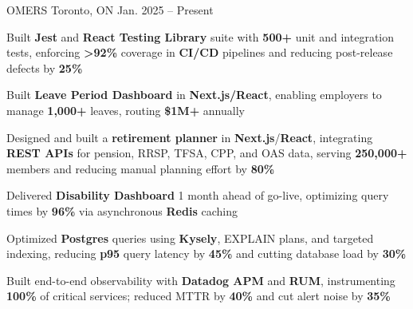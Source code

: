 \documentclass[11pt, a4paper]{awesome-cv}
\begin{document}
\makecvheader[C]


\begin{cventries}


  \cventry
    {\color{lightblue}{ASSOCIATE FULL-STACK ENGINEER}}
    {OMERS}
    {Toronto, ON}
    {Jan. 2025 -- Present}
    {
      \begin{cvitems}
        \item{Built \textbf{Jest} and \textbf{React Testing Library} suite with \textbf{500+} unit and integration tests, enforcing \textbf{>92\%} coverage in \textbf{CI/CD} pipelines and reducing post-release defects by \textbf{25\%}}
        \item{Built \textbf{Leave Period Dashboard} in \textbf{Next.js/React}, enabling employers to manage \textbf{1,000+} leaves, routing \textbf{\$1M+} annually}
        \item{Designed and built a \textbf{retirement planner} in \textbf{Next.js}/\textbf{React}, integrating \textbf{REST APIs} for pension, RRSP, TFSA, CPP, and OAS data, serving \textbf{250,000+} members and reducing manual planning effort by \textbf{80\%}}
        \item{Delivered \textbf{Disability Dashboard} 1 month ahead of go-live, optimizing query times by \textbf{96\%} via asynchronous \textbf{Redis} caching}
        \item{Optimized \textbf{Postgres} queries using \textbf{Kysely}, EXPLAIN plans, and targeted indexing, reducing \textbf{p95} query latency by \textbf{45\%} and cutting database load by \textbf{30\%}}
        \item{Built end-to-end observability with \textbf{Datadog APM} and \textbf{RUM}, instrumenting \textbf{100\%} of critical services; reduced MTTR by \textbf{40\%} and cut alert noise by \textbf{35\%}}
      \end{cvitems}
    }

  \vspace{3mm}


\end{cventries}
\end{document}
